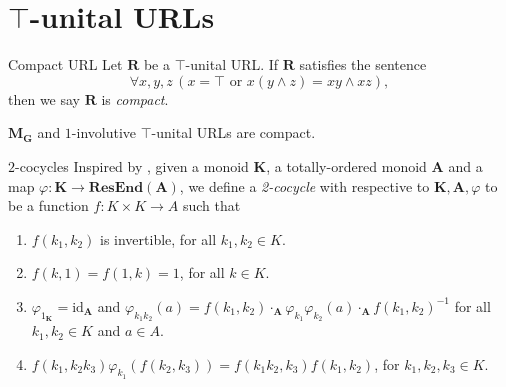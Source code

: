 \documentclass[professionalfont, handout, 12pt]{beamer} %
\theoremstyle{plain}
\theoremstyle{definition}
\newcommand{\m}[1]{{\mathbf {#1} }}
\newcommand{\jn}{\vee}
\newcommand{\mt}{\wedge}
\begin{document}
\section{\texorpdfstring{$\top$-unital}{T-unital} URLs}

\begin{frame}{Compact URL}
    Let $\m R$ be a $\top$-unital URL.
    If $\m R$ satisfies the sentence
    \begin{equation}\tag{compact}\label{compact}
        \forall x, y, z \, (x = \top \text{ or } x (y \mt z) = xy \mt xz),
    \end{equation}
    then we say $\m R$ is \emph{compact}.\pause
    \vspace{20pt}

    $\m {M_G}$ and $1$-involutive $\top$-unital URLs are compact.
\end{frame}


\begin{frame}{$2$-cocycles}
    Inspired by \cite{pavel2002monoid}, given a monoid $\mathbf{K}$, a totally-ordered monoid $\mathbf{A}$ and a map $\varphi: \mathbf{K} \rightarrow \m {ResEnd}(\mathbf{A})$, we define a \emph{2-cocycle} with respective to $\m K, \m A, \varphi$ to be a function $f: K \times K \rightarrow A$ such that
    \begin{enumerate}
    \item $f(k_1, k_2)$ is invertible, for all $k_1, k_2 \in K$.

    \item $f(k, 1) = f(1, k) = 1$, for all $k \in K$.

    \item $\varphi_{1_{\mathbf{K}}} = \text{id}_{\mathbf{A}}$ and $\varphi_{k_1 k_2} (a) = f(k_1, k_2) \cdot_{\mathbf{A}} \varphi_{k_1} \varphi_{k_2} (a) \cdot_{\mathbf{A}} f(k_1, k_2)^{-1}$ for all $k_1, k_2 \in K$ and $a \in A$.
    
    \item $f(k_1, k_2 k_3) \varphi_{k_1}(f(k_2, k_3)) = f(k_1 k_2, k_3) f(k_1, k_2)$, for $k_1, k_2, k_3 \in K$.
    \end{enumerate}
\end{frame}
\end{document}
